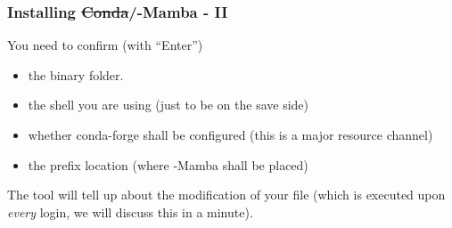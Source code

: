 \begin{frame}
  \frametitle{Installing \sout{Conda}/\textmu-Mamba - II}
  You need to confirm (with ``Enter'')
  \begin{itemize}[<+->]
	\item the binary folder.
	\item the shell you are using (just to be on the save side)
	\item whether conda-forge shall be configured (this is a major resource channel)
	\item the prefix location (where \textmu-Mamba shall be placed)
  \end{itemize} 
  The tool will tell up about the modification of your  file (which is executed upon \emph{every} login, we will discuss this in a minute).
\end{frame}
	

